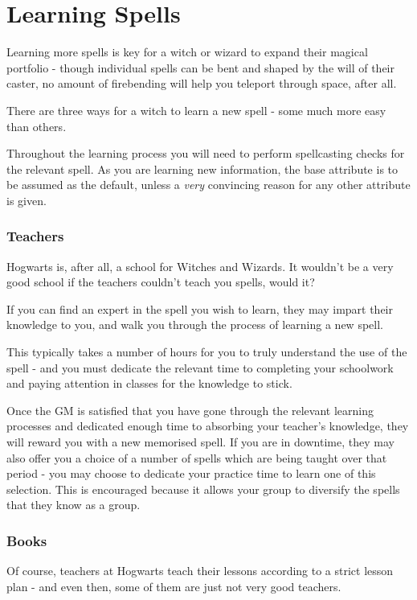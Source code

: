 \chapter{Learning Spells}

Learning more spells is key for a witch or wizard to expand their magical portfolio - though individual spells can be bent and shaped by the will of their caster, no amount of firebending will help you teleport through space, after all. 

There are three ways for a witch to learn a new spell - some much more easy than others. 

Throughout the learning process you will need to perform spellcasting checks for the relevant spell. As you are learning new information, the  base attribute is to be assumed as the default, unless a {\it very} convincing reason for any other attribute is given. 

\subsection{Teachers}

Hogwarts is, after all, a school for Witches and Wizards. It wouldn't be a very good school if the teachers couldn't teach you spells, would it? 

If you can find an expert in the spell you wish to learn, they may impart their knowledge to you, and walk you through the process of learning a new spell. 

This typically takes a number of hours for you to truly understand the use of the spell - and you must dedicate the relevant time to completing your schoolwork and paying attention in classes for the knowledge to stick. 

Once the GM is satisfied that you have gone through the relevant learning processes and dedicated enough time to absorbing your teacher's knowledge, they will reward you with a new memorised spell. If you are in downtime, they may also offer you a choice of a number of spells which are being taught over that period - you may choose to dedicate your practice time to learn one of this selection. This is encouraged because it allows your group to diversify the spells that they know as a group. 


\subsection{Books}

Of course, teachers at Hogwarts teach their lessons according to a strict lesson plan - and even then, some of them are just not very good teachers. 

